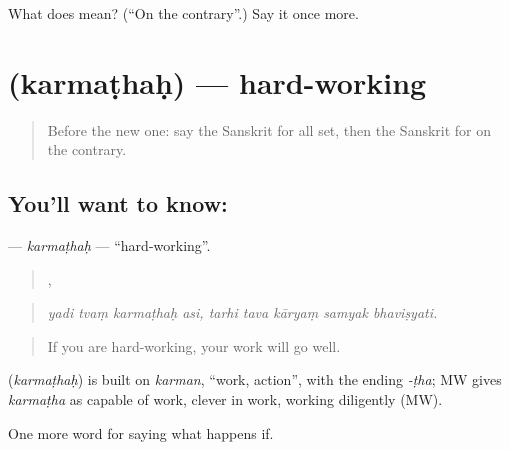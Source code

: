 \begin{tcolorbox}[breakable,colback=teal!4,colframe=teal!35!black,title={Before you move on}]
What does  mean? (\textquotedblleft{}On the contrary\textquotedblright{}.) Say it once more.
\end{tcolorbox}
\section[\texorpdfstring{\sk{कर्मठः} (karmaṭhaḥ)}{कर्मठः (karmaṭhaḥ)}]{ (karmaṭhaḥ) — hard-working}

\label{lesson:SA-C555-karmathah}



\begin{quote}
Before the new one: say the Sanskrit for all set, then the Sanskrit for on the contrary.
\end{quote}

\subsection*{You'll want to know: }
\textbf{} — \emph{karmaṭhaḥ} — \textquotedblleft{}hard-working\textquotedblright{}.

\begin{quote}
   ,     
\end{quote}

\begin{quote}
\emph{yadi tvaṃ karmaṭhaḥ asi, tarhi tava kāryaṃ samyak bhaviṣyati.}
\end{quote}

\begin{quote}
If you are hard-working, your work will go well.
\end{quote}

\begin{cousinweb}
\textbf{} (\emph{karmaṭhaḥ}) is built on \emph{karman}, \textquotedblleft{}work, action\textquotedblright{}, with the ending \emph{-ṭha}; MW gives \emph{karmaṭha} as capable of work, clever in work, working diligently (MW).
\end{cousinweb}

\begin{grammarlens}[title={What you've built}]
One more word for saying what happens if.
\end{grammarlens}

